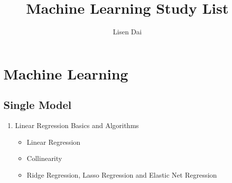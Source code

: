 \documentclass[a4paper, 12pt]{article}
\title{
    Machine Learning Study List
}
\author{
    Lisen Dai
}
\begin{document}
    \section{Machine Learning}
        \subsection{Single Model}
            \begin{enumerate}
                \item {
                    Linear Regression Basics and Algorithms
                    \begin{itemize}
                        \item Linear Regression
                        \item Collinearity 
                        \item Ridge Regression, Lasso Regression and Elastic Net Regression
                    \end{itemize} 
                    } 
            \end{enumerate}
\end{document}
